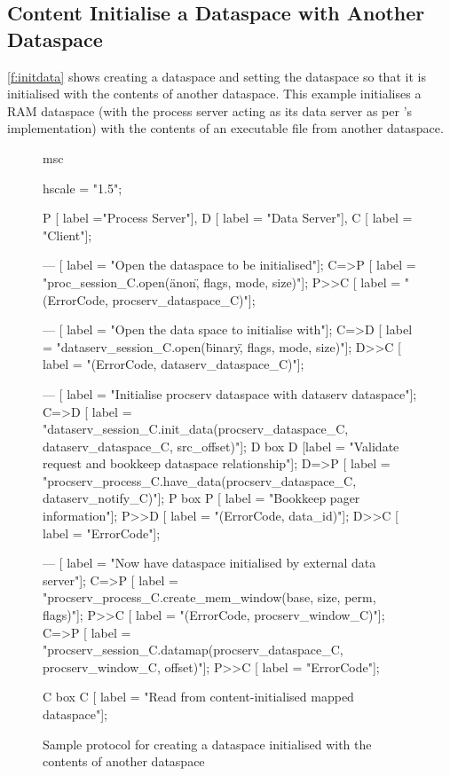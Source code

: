 \clearpage
\subsection{Content Initialise a Dataspace with Another Dataspace}

\autoref{f:initdata} shows creating a dataspace and setting the dataspace so that it is initialised with the contents of another dataspace. This example initialises a RAM dataspace (with the process server acting as its data server as per 's implementation) with the contents of an executable file from another dataspace.

\begin{figure}[htb]
  \begin{center}
    \begin{msc}
      msc {
        hscale = "1.5";

        P [ label ="Process Server"],
        D [ label = "Data Server"],
        C [ label = "Client"];

        --- [ label = "Open the dataspace to be initialised"];
        C=>P [ label = "proc\_session\_C.open(\"anon\", flags, mode, size)"];
        P>>C [ label = "(ErrorCode, procserv\_dataspace\_C)"];

        --- [ label = "Open the data space to initialise with"];
        C=>D [ label = "dataserv\_session\_C.open(\"binary\", flags, mode, size)"];
        D>>C [ label = "(ErrorCode, dataserv\_dataspace\_C)"];

        --- [ label = "Initialise procserv dataspace with dataserv dataspace"];
        C=>D [ label = "dataserv\_session\_C.init\_data(procserv\_dataspace\_C, dataserv\_dataspace\_C, src\_offset)"];
        D box D [label = "Validate request and bookkeep dataspace relationship"];
        D=>P [ label = "procserv\_process\_C.have\_data(procserv\_dataspace\_C, dataserv\_notify\_C)"];
        P box P [ label = "Bookkeep pager information"];
        P>>D [ label = "(ErrorCode, data\_id)"];
        D>>C [ label = "ErrorCode"];

        --- [ label = "Now have dataspace initialised by external data server"];
        C=>P [ label = "procserv\_process\_C.create\_mem\_window(base, size, perm, flags)"];
        P>>C [ label = "(ErrorCode, procserv\_window\_C)"];
        C=>P [ label = "procserv\_session\_C.datamap(procserv\_dataspace\_C, procserv\_window\_C, offset)"];
        P>>C [ label = "ErrorCode"];

        C box C [ label = "Read from content-initialised mapped dataspace"];
      }
    \end{msc}
  \end{center}
  \caption{Sample protocol for creating a dataspace initialised with the contents of another dataspace}
  \label{f:initdata}
\end{figure}

